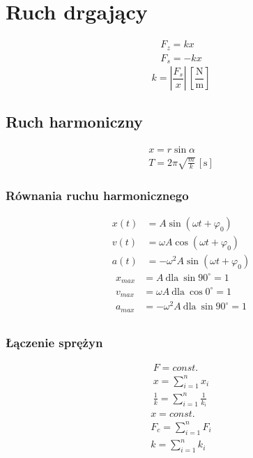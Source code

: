 \documentclass{article}
\numberwithin{equation}{section}
\newcommand{\unit}[1]{\, \left[\mathrm{#1}\right]}
\begin{document}
  \newpage
  \section{Ruch drgający}
    \begin{gather}
      F_z = kx\\
      F_s = -kx
    \end{gather}
    \begin{equation}
      k = \left|\frac{F_s}{x}\right| \unit{\frac Nm}
    \end{equation}
    \subsection{Ruch harmoniczny}
      \begin{gather}
        x = r\sin\alpha\\
        T = 2\pi\sqrt{\frac mk} \unit{s}
      \end{gather}
      \subsubsection{Równania ruchu harmonicznego}
        \begin{align}
          x(t) &= A\sin(\omega t + \varphi_0)\\
          v(t) &= \omega A\cos(\omega t + \varphi_0)\\
          a(t) &= -\omega^2A\sin(\omega t + \varphi_0)
        \end{align}
        \begin{align}
          x_{max} &= A\ \text{dla}\ \sin90^\circ = 1\\
          v_{max} &= \omega A\ \text{dla}\ \cos0^\circ = 1\\
          a_{max} &= -\omega^2A\ \text{dla}\ \sin90^\circ = 1\\
        \end{align}
      \subsubsection{Łączenie sprężyn}
        \begin{gather}
          F = const.\\
          x = \sum_{i=1}^n x_i\\
          \frac{1}{k} = \sum_{i=1}^n \frac{1}{k_i}
        \end{gather}
        \begin{gather}
          x = const.\\
          F_c = \sum_{i=1}^n F_i\\
          k = \sum_{i=1}^n k_i
        \end{gather}
\end{document}
